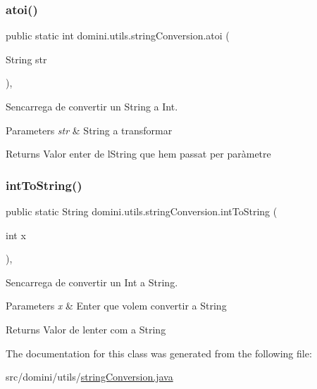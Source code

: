 \subsubsection{\texorpdfstring{atoi()}{atoi()}}
{\footnotesize\ttfamily public static int domini.\+utils.\+string\+Conversion.\+atoi (\begin{DoxyParamCaption}\item[{String}]{str }\end{DoxyParamCaption})\hspace{0.3cm}{\ttfamily [inline]}, {\ttfamily [static]}}



S\textquotesingle{}encarrega de convertir un String a Int. 


\begin{DoxyParams}{Parameters}
{\em str} & String a transformar \\
\hline
\end{DoxyParams}
\begin{DoxyReturn}{Returns}
Valor enter de l\textquotesingle{}String que hem passat per paràmetre 
\end{DoxyReturn}
\mbox{\label{classdomini_1_1utils_1_1stringConversion_ab10fa673e68698a6a0f29971a60fe274}} 
\subsubsection{\texorpdfstring{int\+To\+String()}{intToString()}}
{\footnotesize\ttfamily public static String domini.\+utils.\+string\+Conversion.\+int\+To\+String (\begin{DoxyParamCaption}\item[{int}]{x }\end{DoxyParamCaption})\hspace{0.3cm}{\ttfamily [inline]}, {\ttfamily [static]}}



S\textquotesingle{}encarrega de convertir un Int a String. 


\begin{DoxyParams}{Parameters}
{\em x} & Enter que volem convertir a String \\
\hline
\end{DoxyParams}
\begin{DoxyReturn}{Returns}
Valor de l\textquotesingle{}enter com a String 
\end{DoxyReturn}


The documentation for this class was generated from the following file\+:\begin{DoxyCompactItemize}
\item 
src/domini/utils/\hyperlink{stringConversion_8java}{string\+Conversion.\+java}\end{DoxyCompactItemize}
